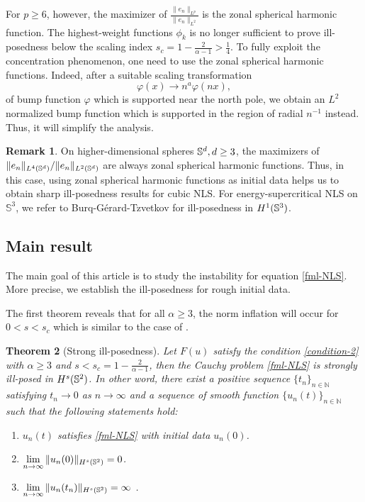 \documentclass[11pt, reqno]{amsart}
\numberwithin{equation}{section}
\newtheorem{theorem}{Theorem}[section]
\theoremstyle{definition}
\newtheorem{remark}[theorem]{Remark}
\theoremstyle{remark}
\begin{document}
For $p \geq 6$, however, the maximizer of $\frac{\|e_n\|_{L^p}}{\|e_n\|_{L^2}}$  is the zonal spherical harmonic function. The highest-weight functions $\phi_k$ is no longer sufficient  to prove ill-posedness below the scaling index $s_c = 1 - \frac{2}{\alpha-1} > \frac14$. To fully exploit the concentration phenomenon, one need to use the zonal spherical harmonic functions. Indeed, after a suitable scaling transformation
\begin{equation*}
\varphi(x) \rightarrow n^a\varphi(nx),
\end{equation*} 
of bump function $\varphi$ which is supported near the north pole, we obtain an $L^2$ normalized bump function which is supported in the region of radial $n^{-1}$ instead. Thus, it will simplify the analysis.
	
	
	
\begin{remark}
On higher-dimensional spheres $\Bbb S^d, d\ge3$, the maximizers of $\|e_n\|_{L^4(\Bbb S^d)}/\|e_n\|_{L^2(\Bbb S^d)}$ are always zonal spherical harmonic functions. Thus, in this case, using zonal spherical harmonic functions as initial data helps us to obtain sharp ill-posedness results for cubic NLS. For energy-supercritical NLS on $\mathbb{S}^3$, we refer to Burq-G\'erard-Tzvetkov \cite{Burq3} for ill-posedness in $H^1(\Bbb S^3)$.
\end{remark} 
	
	

	
	
\subsection{Main result}

The main goal of this article is to study the instability for equation \eqref{fml-NLS}. More precise, we establish the ill-posedness for rough initial data. %

The first theorem reveals that for all $\alpha\geq3$, the norm inflation will occur for $0<s<s_c$ which is similar to the case of \cite{CCT-03}. 
\begin{theorem}[Strong ill-posedness]\label{thm-illpose}
Let $F(u) $ satisfy the condition \eqref{condition-2} with $\alpha\ge 3$ and $s<s_c=1-\frac{2}{\alpha-1}$, then the Cauchy problem \eqref{fml-NLS} is strongly ill-posed in $H^s(\Bbb S^2)$. In other word, there exist a positive sequence $\{t_n\}_{n\in\mathbb{N}}$ satisfying $t_n\to 0$ as $n\to\infty$ and a sequence of smooth function $\{u_n(t)\}_{n\in\mathbb{N}}$ such that the following statements hold:
\begin{enumerate}
\item $u_n(t)$ satisfies \eqref{fml-NLS} with initial data $u_n(0)$.
\item $\lim\limits_{n\to\infty}\|u_n(0)\|_{H^s(\Bbb S^2)} = 0$.
\item $\lim\limits_{n\to\infty}\|u_n(t_n)\|_{H^s(\Bbb S^2)} = \infty$ \label{item-unbound}.
\end{enumerate}
\end{theorem}
	
\end{document}
